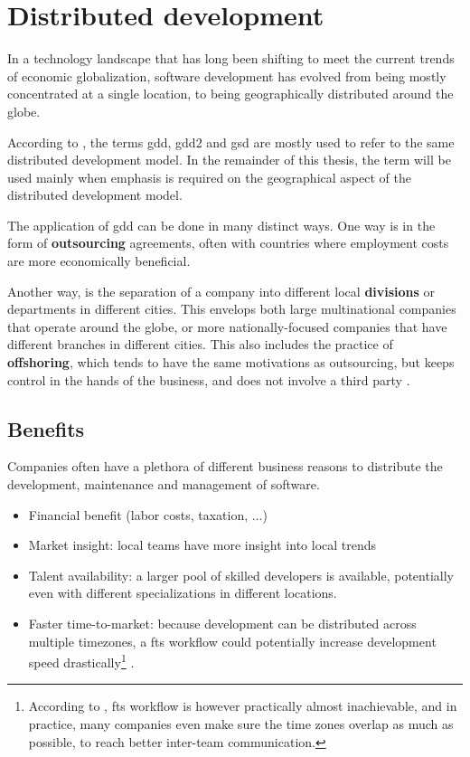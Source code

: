 \section{Distributed development}

In a technology landscape that has long been shifting to meet the current trends
of economic globalization, software development has evolved from being mostly
concentrated at a single location, to being geographically distributed around
the globe. 

According to \textcite{Yuhong_2008}, the terms \gls{gdd}, \gls{gdd2} and
\gls{gsd} are mostly used to refer to the same distributed development model. In
the remainder of this thesis, the term  will be used mainly
when emphasis is required on the geographical aspect of the distributed
development model.

The application of \gls{gdd} can be done in many distinct ways. One way is in
the form of \textbf{\gls{outsourcing}} agreements, often with countries where
employment costs are more economically beneficial.

Another way, is the separation of a company into different local
\textbf{divisions} or departments in different cities. This envelops both large
multinational companies that operate around the globe, or more
nationally-focused companies that have different branches in different cities.
\autocite{Kiel_2003} This also includes the practice of \textbf{\gls{offshoring}},
which tends to have the same motivations as outsourcing, but keeps control in
the hands of the business, and does not involve a third party \autocite{Oshri_2015}.


\subsection{Benefits}

Companies often have a plethora of different business reasons to distribute the
development, maintenance and management of software. 

\begin{itemize}
    \item Financial benefit (labor costs, taxation, ...)
    \item Market insight: local teams have more insight into local trends
    \item Talent availability: a larger pool of skilled developers is available,
    potentially even with different specializations in different locations.
    \autocite{Conchuir_etal_2009}
    \item Faster time-to-market: because development can be distributed across
    multiple timezones, a \gls{fts} workflow could potentially increase
    development speed drastically\footnote{According to
    \textcite{Conchuir_etal_2009}, \gls{fts} workflow is however practically
    almost inachievable, and in practice, many companies even make sure the time
    zones overlap as much as possible, to reach better inter-team communication.
    } \autocite{Carmel_2010}.
\end{itemize}

